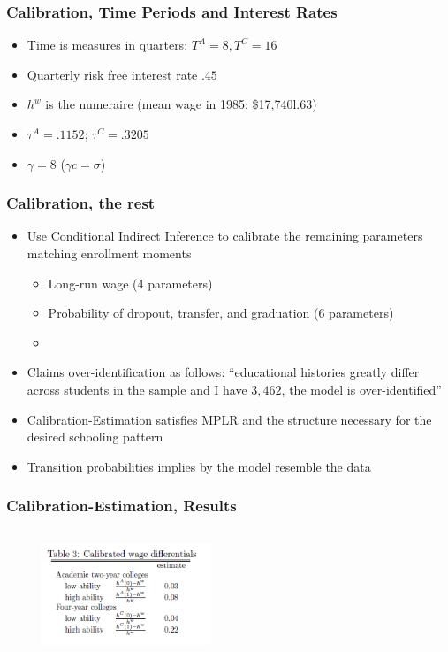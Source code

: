 \begin{frame}
	\frametitle{Calibration, Time Periods and Interest Rates}
		\begin{itemize}
		\item Time is measures in quarters: $T^A = 8, T^C = 16$
		\item Quarterly risk free interest rate $.45$
		\item $h^w$ is the numeraire (mean wage in 1985: \$17,740l.63)
		\item $\tau^A = .1152$; $\tau^C = .3205$
		\item $\gamma = 8$ ($\gamma c = \sigma$)
		\end{itemize}
\end{frame}

\begin{frame}
	\frametitle{Calibration, the rest}
		\begin{itemize}
			\item Use Conditional Indirect Inference to calibrate the remaining parameters matching enrollment moments
				\begin{itemize}
					\item Long-run wage (4 parameters)
					\item Probability of dropout, transfer, and graduation (6 parameters)
					\item
				\end{itemize}
			\item Claims over-identification as follows: ``educational histories greatly differ across students in the sample and I have $3,462$, the model is over-identified''
			\item Calibration-Estimation satisfies MPLR and the structure necessary for the desired schooling pattern
			\item Transition probabilities implies by the model resemble the data
		\end{itemize}
\end{frame}

\begin{frame}
	\frametitle{Calibration-Estimation, Results}
			\begin{figure}[H] 
				\caption*{}
				\centering
				\includegraphics[width=2in, height=1.5in]{Figures/T/table3.png}
		\end{figure}
\end{frame}


